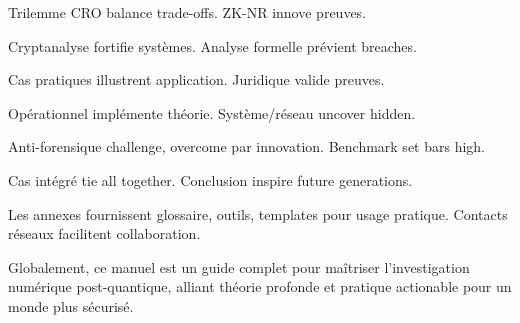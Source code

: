 \documentclass[a4paper,12pt]{extarticle}
\begin{document}
Trilemme CRO balance trade-offs. ZK-NR innove preuves.

Cryptanalyse fortifie systèmes. Analyse formelle prévient breaches.

Cas pratiques illustrent application. Juridique valide preuves.

Opérationnel implémente théorie. Système/réseau uncover hidden.

Anti-forensique challenge, overcome par innovation. Benchmark set bars high.

Cas intégré tie all together. Conclusion inspire future generations.

Les annexes fournissent glossaire, outils, templates pour usage pratique. Contacts réseaux facilitent collaboration.

Globalement, ce manuel est un guide complet pour maîtriser l'investigation numérique post-quantique, alliant théorie profonde et pratique actionable pour un monde plus sécurisé.
\end{document}

